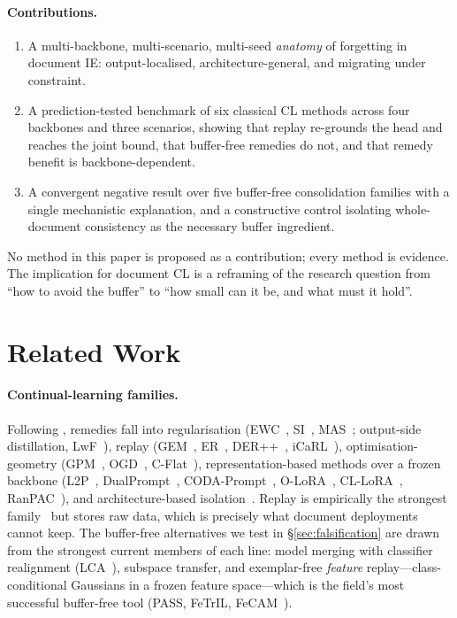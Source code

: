 \documentclass{article}
\begin{document}
\paragraph{Contributions.}
\begin{enumerate}
  \item A multi-backbone, multi-scenario, multi-seed \emph{anatomy} of forgetting in document IE: output-localised, architecture-general, and migrating under constraint.
  \item A prediction-tested benchmark of six classical CL methods across four backbones and three scenarios, showing that replay re-grounds the head and reaches the joint bound, that buffer-free remedies do not, and that remedy benefit is backbone-dependent.
  \item A convergent negative result over five buffer-free consolidation families with a single mechanistic explanation, and a constructive control isolating whole-document consistency as the necessary buffer ingredient.
\end{enumerate}
No method in this paper is proposed as a contribution; every method is evidence. The implication for document CL is a reframing of the research question from ``how to avoid the buffer'' to ``how small can it be, and what must it hold''.

\section{Related Work}
\label{sec:related}
\paragraph{Continual-learning families.} Following \citet{wang2024survey}, remedies fall into regularisation (EWC~\citep{kirkpatrick2017ewc}, SI~\citep{zenke2017si}, MAS~\citep{aljundi2018mas}; output-side distillation, LwF~\citep{li2017lwf}), replay (GEM~\citep{lopezpaz2017gem}, ER~\citep{rolnick2019er}, DER++~\citep{buzzega2020der}, iCaRL~\citep{rebuffi2017icarl}), optimisation-geometry (GPM~\citep{saha2021gpm}, OGD~\citep{farajtabar2020ogd}, C-Flat~\citep{bian2024cflat}), representation-based methods over a frozen backbone (L2P~\citep{wang2022l2p}, DualPrompt~\citep{wang2022dualprompt}, CODA-Prompt~\citep{smith2023coda}, O-LoRA~\citep{wang2023olora}, CL-LoRA~\citep{he2025cllora}, RanPAC~\citep{mcdonnell2023ranpac}), and architecture-based isolation~\citep{mallya2018packnet,yoon2018den}. Replay is empirically the strongest family~\citep{masana2022class,wang2024survey} but stores raw data, which is precisely what document deployments cannot keep. The buffer-free alternatives we test in \S\ref{sec:falsification} are drawn from the strongest current members of each line: model merging with classifier realignment (LCA~\citep{lca2026}), subspace transfer, and exemplar-free \emph{feature} replay---class-conditional Gaussians in a frozen feature space---which is the field's most successful buffer-free tool (PASS, FeTrIL, FeCAM~\citep{zhu2021pass,petit2023fetril,goswami2023fecam}).
\end{document}
